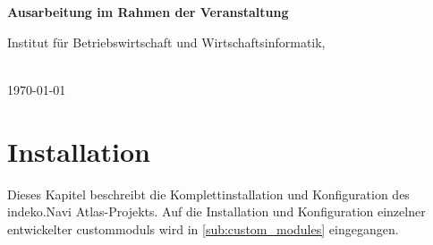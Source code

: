 \begin{titlepage}
\begin{figure}
\begin{minipage}{0.25\textwidth}
\begin{flushright}
        \end{flushright}
    \end{minipage}
    \vspace{4cm}
\end{figure}
\begin{center}

    \Huge{\textbf{\titel}}

    \Huge{\textbf{\untertitel}}
    \vspace{2cm}
\end{center}
\begin{center}
    \vspace*{0cm}
    \textbf{Ausarbeitung im Rahmen der Veranstaltung \veranstaltung}
    \vspace{1cm}
\end{center}
\begin{center}
    Institut für Betriebswirtschaft und Wirtschaftsinformatik,

    \arbeitsgruppe
\end{center}
\begin{center}
    \vspace{5cm}
    \autor\\


    \today
\end{center}
\end{titlepage}
\newpage


\tableofcontents

\newpage
\listoffigures
\listoftables
\thispagestyle{empty}

\glsaddall
\printglossary[type=\acronymtype,title = Abkürzungsverzeichnis]

\newpage
\restoregeometry
{}




\section{Installation}
Dieses Kapitel beschreibt die Komplettinstallation und Konfiguration des \acrshort{indeko}.Navi Atlas-Projekts. Auf die Installation und Konfiguration einzelner entwickelter \glspl{custommodul} wird in \cref{sub:custom_modules} eingegangen.



